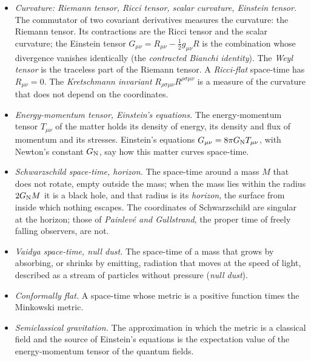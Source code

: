 \documentclass[
  10pt,
]{article}
\begin{document}
\begin{itemize}
  the frame vectors of a tetrad, \(\omega_\mu{}^a{}_b\); it is fixed by
  the requirement (the tetrad postulate) that the tetrad be covariantly
  constant. Acting on spinors through the generators of the Lorentz
  algebra, it becomes the spinor connection \(\Gamma^{\rm LL}_\mu\) of
  the covariant derivative of a Dirac field. \emph{Anholonomy
  coefficients} measure how far the frame vectors are from coordinate
  directions.
\item
  \emph{Curvature: Riemann tensor, Ricci tensor, scalar curvature,
  Einstein tensor.} The commutator of two covariant derivatives measures
  the curvature: the Riemann tensor. Its contractions are the Ricci
  tensor and the scalar curvature; the Einstein tensor
  \(G_{\mu\nu}=R_{\mu\nu}-\tfrac12g_{\mu\nu}R\) is the combination whose
  divergence vanishes identically (the \emph{contracted Bianchi
  identity}). The \emph{Weyl tensor} is the traceless part of the
  Riemann tensor. A \emph{Ricci-flat} space-time has \(R_{\mu\nu}=0\).
  The \emph{Kretschmann invariant}
  \(R_{\rho\sigma\mu\nu}R^{\rho\sigma\mu\nu}\) is a measure of the
  curvature that does not depend on the coordinates.
\item
  \emph{Energy-momentum tensor, Einstein's equations.} The
  energy-momentum tensor \(T_{\mu\nu}\) of the matter holds its density
  of energy, its density and flux of momentum and its stresses.
  Einstein's equations \(G_{\mu\nu}=8\pi G_{\rm N}T_{\mu\nu}\), with
  Newton's constant \(G_{\rm N}\), say how this matter curves
  space-time.
\item
  \emph{Schwarzschild space-time, horizon.} The space-time around a mass
  \(M\) that does not rotate, empty outside the mass; when the mass lies
  within the radius \(2G_{\rm N}M\) it is a black hole, and that radius
  is its \emph{horizon}, the surface from inside which nothing escapes.
  The coordinates of Schwarzschild are singular at the horizon; those of
  \emph{Painlevé and Gullstrand}, the proper time of freely falling
  observers, are not.
\item
  \emph{Vaidya space-time, null dust.} The space-time of a mass that
  grows by absorbing, or shrinks by emitting, radiation that moves at
  the speed of light, described as a stream of particles without
  pressure (\emph{null dust}).
\item
  \emph{Conformally flat.} A space-time whose metric is a positive
  function times the Minkowski metric.
\item
  \emph{Semiclassical gravitation.} The approximation in which the
  metric is a classical field and the source of Einstein's equations is
  the expectation value of the energy-momentum tensor of the quantum
  fields.
\end{itemize}
\end{document}
